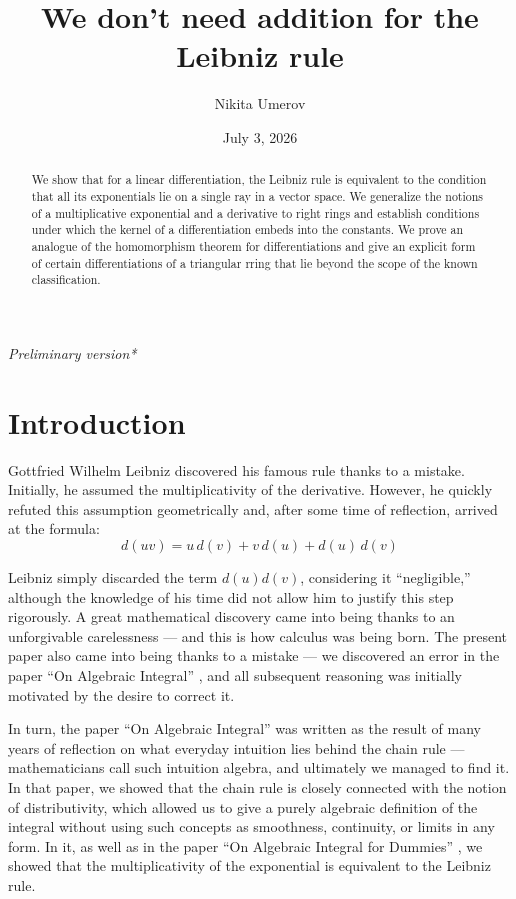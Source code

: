 \documentclass[12pt]{article}
\title{We don't need addition for the Leibniz rule}
\author{Nikita Umerov}
\date{July 3, 2026}
\theoremstyle{definition}
\begin{document}
\maketitle

{\centering
\noindent\textit{Preliminary version*}
\par}

\begin{abstract}
We show that for a linear differentiation, the Leibniz rule is equivalent to the condition that 
all its exponentials lie on a single ray in a vector space. We generalize 
the notions of a multiplicative exponential and a derivative to right rings 
and establish conditions under which the kernel of a differentiation embeds into the constants. 
We prove an analogue of the homomorphism theorem for differentiations and give an explicit form of certain 
differentiations of a triangular rring that lie beyond the scope of the known classification.
\end{abstract}

\tableofcontents

\section*{Introduction}

Gottfried Wilhelm Leibniz discovered his famous rule thanks to a mistake. Initially, he assumed the multiplicativity 
of the derivative. However, he quickly refuted this assumption geometrically and, after some time of reflection, 
arrived at the formula:
\[
d(uv) = u\,d(v) + v\,d(u) + d(u)\,d(v)
\]

Leibniz simply discarded the term \(d(u)d(v)\), considering it ``negligible,'' although the knowledge of his time 
did not allow him to justify this step rigorously. A great mathematical discovery came into being thanks 
to an unforgivable carelessness --- and this is how calculus was being born.
The present paper also came into being thanks to a mistake --- we discovered an error in the paper 
``On Algebraic Integral'' \cite{umerov2025}, and all subsequent reasoning was initially motivated by the desire to correct it.

\vspace{5pt}

In turn, the paper ``On Algebraic Integral'' was written as the result of many years of reflection on what 
everyday intuition lies behind the chain rule --- mathematicians call such intuition algebra, 
and ultimately we managed to find it. In that paper, we showed that the chain rule is closely 
connected with the notion of distributivity, which allowed us to give a purely algebraic definition 
of the integral without using such concepts as smoothness, continuity, or limits in any form. 
In it, as well as in the paper ``On Algebraic Integral for Dummies'' \cite{umerov2026}, we showed that 
the multiplicativity of the exponential is equivalent to the Leibniz rule.
\end{document}
